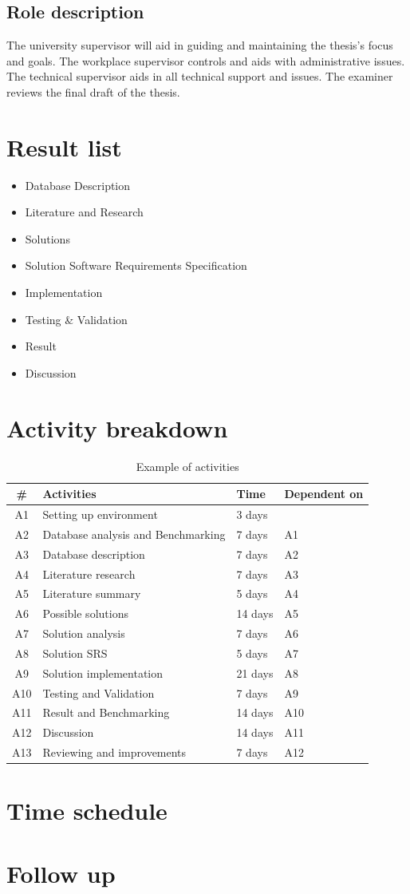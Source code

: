 \documentclass[12pt,a4paper]{article}
\begin{document}
\subsection*{Role description}
The university supervisor will aid in guiding and maintaining the thesis's focus and goals. The workplace supervisor controls and aids with administrative issues. The technical supervisor aids in all technical support and issues. The examiner reviews the final draft of the thesis. 




\section*{Result list}
\begin{itemize}
\item Database Description
\item Literature and Research
\item Solutions
\item Solution Software Requirements Specification
\item Implementation
\item Testing \& Validation
\item Result
\item Discussion
\end{itemize}

\section*{Activity breakdown}
\begin{table}[H]
    \begin{tabular}{| c | l | l | l |}
    \hline
    \# & \textbf{Activities} & \textbf{Time} & \textbf{Dependent on}\\\hline
		A1 & Setting up environment & 3 days & \\\hline
  		A2 & Database analysis and Benchmarking &  7 days & A1 \\\hline
  		A3 & Database description & 7 days & A2 \\\hline
    A4 & Literature research & 7 days & A3 \\\hline
    A5 & Literature summary & 5 days & A4 \\\hline
    A6 & Possible solutions & 14 days & A5 \\\hline
    A7 & Solution analysis & 7 days & A6 \\\hline
    A8 & Solution SRS & 5 days & A7 \\\hline
    A9 & Solution implementation & 21 days & A8 \\\hline
    A10 & Testing and Validation & 7 days & A9 \\\hline
    A11 & Result and Benchmarking & 14 days & A10 \\\hline
    A12 & Discussion & 14 days & A11 \\\hline
    A13 & Reviewing and improvements & 7 days & A12 \\\hline
    \end{tabular}
    \caption{Example of activities}
\end{table}

\section*{Time schedule}

\section*{Follow up}
\end{document}

